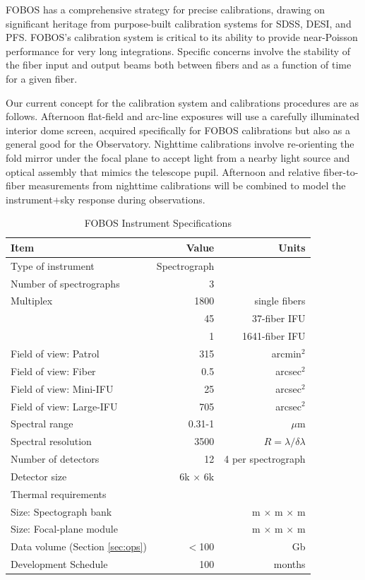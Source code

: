 \documentclass[oneside,11pt]{amsart}
\begin{document}
FOBOS has a comprehensive strategy for precise calibrations, drawing
on significant heritage from purpose-built calibration systems for
SDSS, DESI, and PFS. FOBOS's calibration system is critical to its
ability to provide near-Poisson performance for very long
integrations. Specific concerns involve the stability of the fiber
input and output beams both between fibers and as a function of time
for a given fiber.

Our current concept for the calibration system and calibrations
procedures are as follows. Afternoon flat-field and arc-line
exposures will use a carefully illuminated interior dome screen,
acquired specifically for FOBOS calibrations but also as a general
good for the Observatory. Nighttime calibrations involve re-orienting
the fold mirror under the focal plane to accept light from a nearby
light source and optical assembly that mimics the telescope pupil.
Afternoon and relative fiber-to-fiber measurements from nighttime
calibrations will be combined to model the instrument$+$sky response
during observations.

\begin{table}[h!]
\centering
\caption{FOBOS Instrument Specifications}
\footnotesize
\begin{tabular}{| l | r | r |}
\hline
{\bf Item} & {\bf Value} & {\bf Units} \\
\hline
\hline
Type of instrument      & Spectrograph & \\\hline
Number of spectrographs & 3 & \\\hline
Multiplex & 1800 & single fibers \\
                        & 45 & 37-fiber IFU \\
                        & 1 & 1641-fiber IFU \\\hline
Field of view: Patrol   & 315 & arcmin$^2$ \\\hline
Field of view: Fiber    & 0.5 & arcsec$^2$ \\\hline
Field of view: Mini-IFU & 25 & arcsec$^2$ \\\hline
Field of view: Large-IFU & 705 & arcsec$^2$ \\\hline
Spectral range          & 0.31-1 & $\mu$m \\\hline
Spectral resolution     & 3500 & $R=\lambda/\delta\lambda$ \\\hline
Number of detectors     & 12 & 4 per spectrograph \\\hline
Detector size           & 6k $\times$ 6k & \\\hline
Thermal requirements    & & \\\hline
Size: Spectograph bank  & & m $\times$ m $\times$ m \\\hline
Size: Focal-plane module & & m $\times$ m $\times$ m \\\hline
Data volume (Section \ref{sec:ops})           & $<$100 & Gb \\\hline
Development Schedule    & 100 & months \\\hline
\end{tabular}
\label{tab:instrument}
\end{table}
\end{document}
